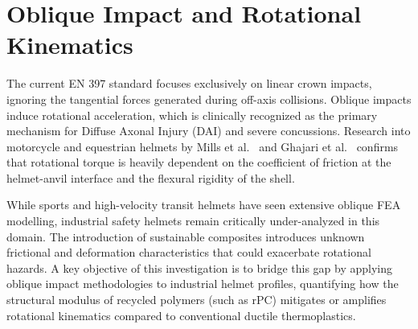 \section{Oblique Impact and Rotational Kinematics}
The current EN 397 standard focuses exclusively on linear crown impacts, ignoring the tangential forces generated during off-axis collisions. Oblique impacts induce rotational acceleration, which is clinically recognized as the primary mechanism for Diffuse Axonal Injury (DAI) and severe concussions. Research into motorcycle and equestrian helmets by Mills et al.~\cite{mills2009} and Ghajari et al.~\cite{ghajari2011} confirms that rotational torque is heavily dependent on the coefficient of friction at the helmet-anvil interface and the flexural rigidity of the shell. 

While sports and high-velocity transit helmets have seen extensive oblique FEA modelling, industrial safety helmets remain critically under-analyzed in this domain. The introduction of sustainable composites introduces unknown frictional and deformation characteristics that could exacerbate rotational hazards. A key objective of this investigation is to bridge this gap by applying oblique impact methodologies to industrial helmet profiles, quantifying how the structural modulus of recycled polymers (such as rPC) mitigates or amplifies rotational kinematics compared to conventional ductile thermoplastics.
